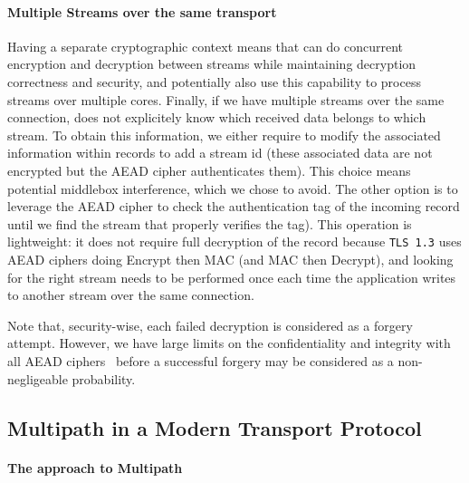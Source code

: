 \paragraph*{Multiple Streams over the same transport}
Having a separate cryptographic context means that \tcpls can do concurrent
encryption and decryption between streams while maintaining decryption
correctness and security, and potentially also use this capability to process
streams over multiple cores. Finally, if we have multiple streams over the same
\tcp connection, \tcpls does not explicitely know which received data belongs to
which stream. To obtain this information, we either require to modify the
associated information within  \tls records to add a stream id (these associated
data are not encrypted but the AEAD cipher authenticates them). This choice
means potential middlebox interference, which we chose to avoid. The other
option is to leverage the AEAD cipher to check the authentication tag of the
incoming record until we find the stream that properly verifies the tag). This
operation is lightweight: it does not require full decryption of the record
because \texttt{TLS 1.3} uses AEAD ciphers doing Encrypt then MAC (and MAC then
Decrypt), and looking for the right stream needs to be performed once each time
the application writes to another stream over the same \tcp connection.

Note that, security-wise, each failed decryption is considered as a
forgery attempt. However, we have large limits on the confidentiality and
integrity with all AEAD ciphers~\cite{luykx2015limits, aeadlimits} before a
successful forgery may be considered as a non-negligeable probability.



\subsection{Multipath in a Modern Transport Protocol}
\label{sec:multipath}

\paragraph*{The \tcpls approach to Multipath}

